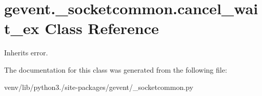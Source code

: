 \hypertarget{classgevent_1_1__socketcommon_1_1cancel__wait__ex}{}\section{gevent.\+\_\+socketcommon.\+cancel\+\_\+wait\+\_\+ex Class Reference}
\label{classgevent_1_1__socketcommon_1_1cancel__wait__ex}


Inherits error.



The documentation for this class was generated from the following file\+:\begin{DoxyCompactItemize}
\item 
venv/lib/python3./site-\/packages/gevent/\+\_\+socketcommon.\+py\end{DoxyCompactItemize}
